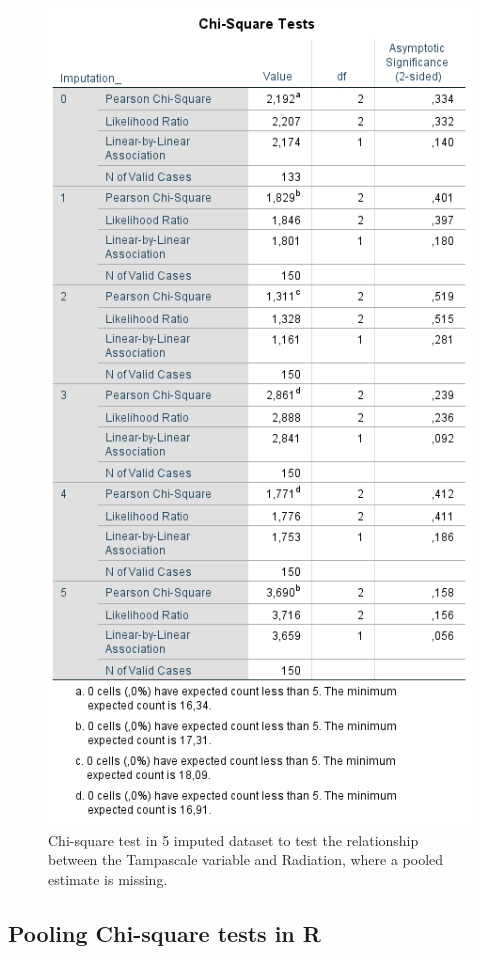 \documentclass[]{book}
\theoremstyle{definition}
\theoremstyle{definition}
\theoremstyle{definition}
\theoremstyle{remark}
\begin{document}
\begin{figure}

{\centering \includegraphics[width=0.9\linewidth]{images/table5.6} 

}

\caption{Chi-square test in 5 imputed dataset to test the relationship between the Tampascale variable and Radiation, where a pooled estimate is missing.}\label{fig:tab5-6}
\end{figure}

\subsection{Pooling Chi-square tests in
R}\label{pooling-chi-square-tests-in-r}
\end{document}
